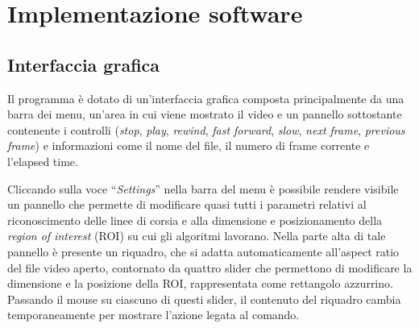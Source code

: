 \documentclass[12pt]{article}
\begin{document}
\newpage
\section{Implementazione software}
\subsection{Interfaccia grafica}
\hspace{0.2 cm} Il programma è dotato di un'interfaccia grafica composta principalmente da una barra dei menu, un'area in cui viene mostrato il video e un pannello sottostante contenente i controlli (\textit{stop}, \textit{play}, \textit{rewind}, \textit{fast forward}, \textit{slow}, \textit{next frame}, \textit{previous frame}) e informazioni come il nome del file, il numero di frame corrente e l'elapsed time.

Cliccando sulla voce ``\textit{Settings}'' nella barra del menu è possibile rendere visibile un pannello che permette di modificare quasi tutti i parametri relativi al riconoscimento delle linee di corsia e alla dimensione e posizionamento della \textit{region of interest} (ROI) su cui gli algoritmi lavorano.
Nella parte alta di tale pannello è presente un riquadro, che si adatta automaticamente all'aspect ratio del file video aperto, contornato da quattro slider che permettono di modificare la dimensione e la posizione della ROI, rappresentata come rettangolo azzurrino. Passando il mouse su ciascuno di questi slider, il contenuto del riquadro cambia temporaneamente per mostrare l'azione legata al comando.
\end{document}
